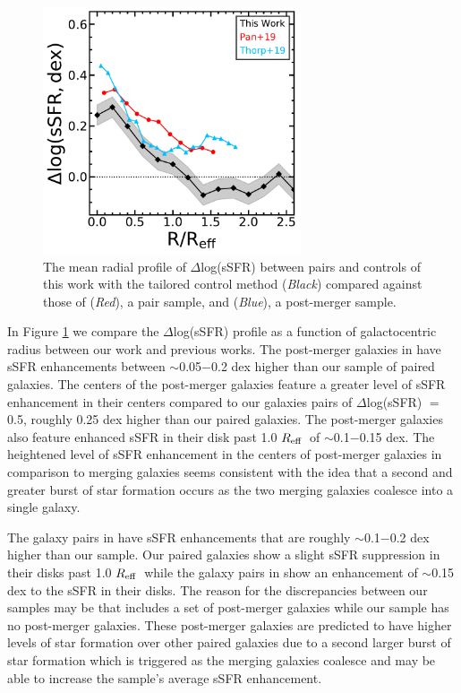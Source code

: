 \documentclass[iop,revtex4,twocolumn,apj,numberedappendix,appendixfloats]{emulateapj}
\newcommand{\reff}{$R_{\rm eff}$}
\begin{document}
\begin{figure}
\centering
\includegraphics[width=3in]{fig/prof_comp.pdf}
\caption[]{The mean radial profile of $\Delta$log(sSFR) between pairs and controls of this work with the tailored control method ({\it Black}) compared against those of \citet{Pan:2019} ({\it Red}), a pair sample, and \citet{Thorp:2019} ({\it Blue}), a post-merger sample.}
\label{fig:prof_comp}
\end{figure}

In Figure \ref{fig:prof_comp} we compare the $\Delta$log(sSFR) profile as a function of galactocentric radius between our work and previous works. The post-merger galaxies in \citet{Thorp:2019} have sSFR enhancements between $\sim$0.05$-$0.2 dex higher than our sample of paired galaxies. The centers of the post-merger galaxies feature a greater level of sSFR enhancement in their centers compared to our galaxies pairs of $\Delta$log(sSFR) $=$ 0.5, roughly 0.25 dex higher than our paired galaxies. The post-merger galaxies also feature enhanced sSFR in their disk past 1.0 \reff\ of $\sim$0.1$-$0.15 dex. The heightened level of sSFR enhancement in the centers of post-merger galaxies in comparison to merging galaxies seems consistent with the idea that a second and greater burst of star formation occurs as the two merging galaxies coalesce into a single galaxy. 

The galaxy pairs in \citet{Pan:2019} have sSFR enhancements that are roughly $\sim$0.1$-$0.2 dex higher than our sample. Our paired galaxies show a slight sSFR suppression in their disks past 1.0 \reff\ while the galaxy pairs in \citet{Pan:2019} show an enhancement of $\sim$0.15 dex to the sSFR in their disks. The reason for the discrepancies between our samples may be that \citet{Pan:2019} includes a set of post-merger galaxies while our sample has no post-merger galaxies. These post-merger galaxies are predicted to have higher levels of star formation over other paired galaxies due to a second larger burst of star formation which is triggered as the merging galaxies coalesce and may be able to increase the sample's average sSFR enhancement. 
\end{document}
